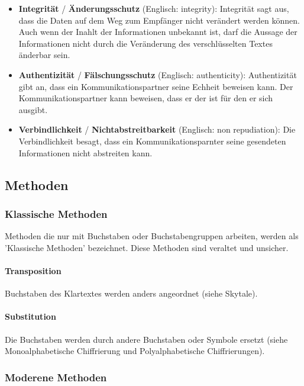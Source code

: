 \documentclass[12pt,a4paper]{report}
\begin{document}
\begin{onehalfspace}
\begin{itemize}
\item \textbf{Integrität} / \textbf{Änderungsschutz}  (Englisch: integrity): Integrität sagt aus, dass die Daten auf dem Weg zum Empfänger nicht verändert werden können. Auch wenn der Inahlt der Informationen unbekannt ist, darf die Aussage der Informationen nicht durch die Veränderung des verschlüsselten Textes änderbar sein.

\item \textbf{Authentizität} / \textbf{Fälschungsschutz} (Englisch: authenticity): Authentizität gibt an, dass ein Kommunikationspartner seine Echheit beweisen kann. Der Kommunikationspartner kann beweisen, dass er der ist für den er sich ausgibt.

\item \textbf{Verbindlichkeit} / \textbf{Nichtabstreitbarkeit} (Englisch: non repudiation): Die Verbindlichkeit besagt, dass ein Kommunikationsparnter seine gesendeten Informationen nicht abstreiten kann.
\end{itemize}

\subsection{Methoden}

\subsubsection{Klassische Methoden}

Methoden die nur mit Buchstaben oder Buchstabengruppen arbeiten, werden als 'Klassische Methoden' bezeichnet. Diese Methoden sind veraltet und unsicher.

\paragraph{Transposition}

Buchstaben des Klartextes werden anders angeordnet (siehe Skytale).

\paragraph{Substitution}

Die Buchstaben werden durch andere Buchstaben oder Symbole ersetzt (siehe Monoalphabetische Chiffrierung und Polyalphabetische Chiffrierungen).

\subsubsection{Moderene Methoden}


\end{onehalfspace}
\end{document}
